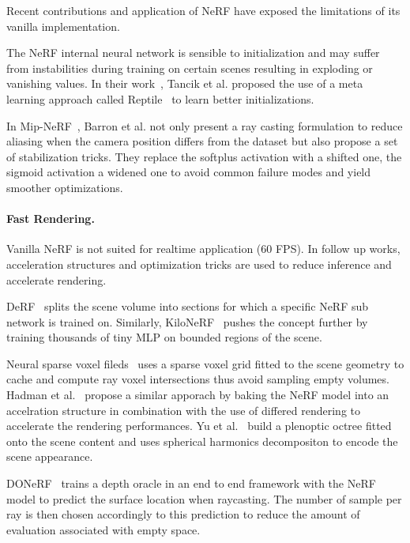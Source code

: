 \documentclass[runningheads]{llncs}
\begin{document}
Recent contributions and application of \gls{NeRF} have exposed the limitations of its vanilla implementation.

The \gls{NeRF} internal neural network is sensible to initialization and may suffer from instabilities during training on certain scenes resulting in exploding or vanishing values. In their work~\cite{Tancik2021}, Tancik et al. proposed the use of a meta learning approach called Reptile~\cite{Nichol2018} to learn better initializations.

In Mip-NeRF~\cite{Barron2021}, Barron et al. not only present a ray casting formulation to reduce aliasing when the camera position differs from the dataset but also propose a set of stabilization tricks. They replace the softplus activation with a shifted one, the sigmoid activation a widened one to avoid common failure modes and yield smoother optimizations.

\paragraph{\textbf{Fast Rendering.}}

Vanilla \gls{NeRF} is not suited for realtime application ($60$ \gls{FPS}). In follow up works, acceleration structures and optimization tricks are used to reduce inference and accelerate rendering.

DeRF~\cite{Rebain2021} splits the scene volume into sections for which a specific \gls{NeRF} sub network is trained on. Similarly, KiloNeRF~\cite{Reiser2021} pushes the concept further by training thousands of tiny \gls{MLP} on bounded regions of the scene.

Neural sparse voxel fileds~\cite{Liu2020} uses a sparse voxel grid fitted to the scene geometry to cache and compute ray voxel intersections thus avoid sampling empty volumes. Hadman et al.~\cite{Hedman2021} propose a similar apporach by baking the \gls{NeRF} model into an accelration structure in combination with the use of differed rendering to accelerate the rendering performances. Yu et al.~\cite{Yu2021} build a plenoptic octree fitted onto the scene content and uses spherical harmonics decompositon to encode the scene appearance.

DONeRF~\cite{Neff2021} trains a depth oracle in an end to end framework with the \gls{NeRF} model to predict the surface location when raycasting. The number of sample per ray is then chosen accordingly to this prediction to reduce the amount of evaluation associated with empty space.
\end{document}
